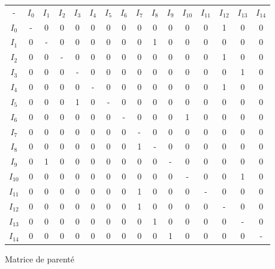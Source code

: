 \documentclass[utf8,final]{stageM2R} %
\begin{document}
\begin{figure}
  \centering
  \begin{tabular}{|c||c|c|c|c|c|c|c|c|c|c|c|c|c|c|c|}
    \hline
    - & $I_{0}$ & $I_{1}$ & $I_{2}$ & $I_{3}$ & $I_{4}$ & $I_{5}$ & $I_{6}$ & $I_{7}$ & $I_{8}$ & $I_{9}$ & $I_{10}$ & $I_{11}$ & $I_{12}$ & $I_{13}$ & $I_{14}$ \\ \hhline{|=::=|=|=|=|=|=|=|=|=|=|=|=|=|=|=|}
    $I_{0}$ & - & 0 & 0 & 0 & 0 & 0 & 0 & 0 & 0 & 0 & 0 & 0 & 1 & 0 & 0 \\ \hline 
    $I_{1}$ & 0 & - & 0 & 0 & 0 & 0 & 0 & 0 & 1 & 0 & 0 & 0 & 0 & 0 & 0 \\ \hline 
    $I_{2}$ & 0 & 0 & - & 0 & 0 & 0 & 0 & 0 & 0 & 0 & 0 & 0 & 1 & 0 & 0 \\ \hline 
    $I_{3}$ & 0 & 0 & 0 & - & 0 & 0 & 0 & 0 & 0 & 0 & 0 & 0 & 0 & 1 & 0 \\ \hline 
    $I_{4}$ & 0 & 0 & 0 & 0 & - & 0 & 0 & 0 & 0 & 0 & 0 & 0 & 1 & 0 & 0 \\ \hline 
    $I_{5}$ & 0 & 0 & 0 & 1 & 0 & - & 0 & 0 & 0 & 0 & 0 & 0 & 0 & 0 & 0 \\ \hline 
    $I_{6}$ & 0 & 0 & 0 & 0 & 0 & 0 & - & 0 & 0 & 0 & 1 & 0 & 0 & 0 & 0 \\ \hline 
    $I_{7}$ & 0 & 0 & 0 & 0 & 0 & 0 & 0 & - & 0 & 0 & 0 & 0 & 0 & 0 & 0 \\ \hline 
    $I_{8}$ & 0 & 0 & 0 & 0 & 0 & 0 & 0 & 1 & - & 0 & 0 & 0 & 0 & 0 & 0 \\ \hline 
    $I_{9}$ & 0 & 1 & 0 & 0 & 0 & 0 & 0 & 0 & 0 & - & 0 & 0 & 0 & 0 & 0 \\ \hline 
    $I_{10}$& 0 & 0 & 0 & 0 & 0 & 0 & 0 & 0 & 0 & 0 & - & 0 & 0 & 1 & 0 \\ \hline 
    $I_{11}$& 0 & 0 & 0 & 0 & 0 & 0 & 0 & 1 & 0 & 0 & 0 & - & 0 & 0 & 0 \\ \hline 
    $I_{12}$& 0 & 0 & 0 & 0 & 0 & 0 & 0 & 1 & 0 & 0 & 0 & 0 & - & 0 & 0 \\ \hline 
    $I_{13}$& 0 & 0 & 0 & 0 & 0 & 0 & 0 & 0 & 1 & 0 & 0 & 0 & 0 & - & 0 \\ \hline 
    $I_{14}$& 0 & 0 & 0 & 0 & 0 & 0 & 0 & 0 & 0 & 1 & 0 & 0 & 0 & 0 & - \\ \hline 

  \end{tabular}
  \caption{Matrice de parenté}
  \label{parentage_matrix_example}
\end{figure}
\end{document}
